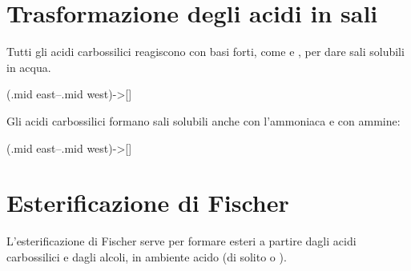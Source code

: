 \section{Trasformazione degli acidi in sali}
Tutti gli acidi carbossilici reagiscono con basi forti, come  e , per dare sali solubili in acqua.

\begingroup
\chemnameinit{}
\begin{reaction}
	\+
	\arrow(.mid east--.mid west){->[]}
	\+ 
\end{reaction}
\chemnameinit{}
\endgroup

Gli acidi carbossilici formano sali solubili anche con l'ammoniaca e con ammine:
\begingroup
\chemnameinit{}
\begin{reaction*}
	\+
	\arrow(.mid east--.mid west){->[]}
	\+ 
\end{reaction*}
\chemnameinit{}
\endgroup






\section{Esterificazione di Fischer}
L'esterificazione di Fischer serve per formare esteri a partire dagli acidi carbossilici e dagli alcoli, in ambiente acido (di solito  o ).
\begin{reaction}
	\+
	\arrow{->[\ch{H2SO4}]}
	\+ 
\end{reaction}

